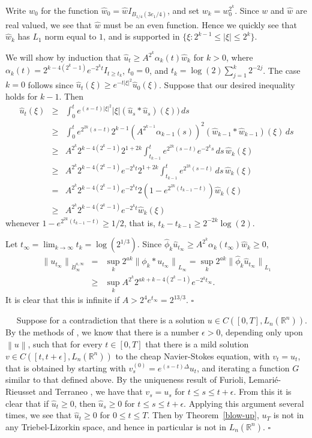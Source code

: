 \documentclass[12pt]{article}
\newcommand{\R}{{\mathbb R}}
\newcommand{\modo}[1]{{\left|#1\right|}}
\newcommand{\normo}[1]{{\left\|#1\right\|}}
\newcommand{\snormo}[1]{{\mathopen\|#1\mathclose\|}}
\newcommand{\Proofof}[1]{\medskip\noindent{\bf Proof of #1:}\ \ }
\newcommand{\qed}{\leavevmode\unskip\penalty9999
                  \hbox{}\nobreak\hfill$\square$\goodbreak\medskip}
\begin{document}
Write $w_0$ for the function
$
\hat w_0 = \hat w I_{B_{1/4}(3e_1/4)} 
$,
and set $w_k = w_0^{2^k}$.  Since $w$ and $\hat w$ are real valued,
we see that $\hat w$ must be an even function.
Hence we quickly see that
$\hat w_k$ has $L_1$ norm equal to $1$, and is supported in 
$\{\xi:2^{k-1} \le \modo\xi \le 2^k\}$.

We will show by induction
that
$
\hat u_t \ge A^{2^k} \alpha_k(t) \hat w_k 
$
for $k>0$,
where $\alpha_k(t) = 2^{k-4(2^k-1)} e^{-2^k t} I_{t \ge t_k}$,
$t_0=0$, and $t_k = \log(2) \sum_{j=1}^k 2^{-2j}$.
The case $k=0$ follows since
$\hat u_t(\xi) \ge e^{-t \modo{\xi}^2} \hat u_0(\xi)$.
Suppose that our desired inequality holds for $k-1$.  Then
\begin{eqnarray*}
\hat u_t(\xi)
&\ge&
\int_0^t e^{(s-t)\modo{\xi}^2} \modo{\xi} (\hat u_s*\hat u_s)(\xi)) \, ds\\
&\ge&
\int_0^t e^{2^{2k}(s-t)} 2^{k-1} (A^{2^{k-1}} \alpha_{k-1}(s))^2
(\hat w_{k-1}*\hat w_{k-1})(\xi) \, ds\\
&\ge&
A^{2^k} 2^{k-4(2^k-1)} 2^{1+2k}
\int_{t_{k-1}}^t e^{2^{2k}(s-t)} e^{-2^k s} \, ds \, 
\hat w_k(\xi) \\
&\ge&
A^{2^k} 2^{k-4(2^k-1)} e^{-2^k t} 2^{1+2k} 
\int_{t_{k-1}}^t e^{2^{2k}(s-t)} \, ds \, \hat w_k(\xi)\\
&=&
A^{2^k} 2^{k-4(2^k-1)} e^{-2^k t}
2(1-e^{2^{2k}(t_{k-1}-t)}) \hat w_k(\xi)\\
&\ge&
A^{2^k} 2^{k-4(2^k-1)} e^{-2^k t} \hat w_k(\xi)
\end{eqnarray*}
whenever $1-e^{2^{2k}(t_{k-1}-t)} \ge 1/2$, that is, $t_k-t_{k-1} \ge 
2^{-2k} \log(2)$.

Let $t_\infty = \lim_{k\to\infty} t_k
= \log(2^{1/3})$.
Since 
$\hat \phi_k \hat u_{t_\infty} \ge A^{2^k} \alpha_k(t_\infty) \hat w_k \ge 0$,
\begin{eqnarray*}
\snormo{u_{t_\infty}}_{\dot B_{\infty}^{a,\infty}} 
&=& 
\sup_k 2^{ak} \snormo{\phi_k*u_{t_\infty}}_{L_\infty}
=
\sup_k 2^{ak} \snormo{\hat \phi_k \hat u_{t_\infty}}_{L_1} 
\\
&\ge&
\sup_k 
A^{2^k} 2^{ak+k-4(2^k-1)} e^{-2^k t_\infty} .
\end{eqnarray*}
It is clear that this is infinite if $A>2^4 e^{t_\infty} = 2^{13/3}$.
\qed

\Proofof{Corollary~\ref{no-Ln}}
Suppose for a contradiction that there is a solution 
$u \in C([0,T],L_n(\R^n))$.  By the methods of \cite{K}, 
we know that there is a 
number $\epsilon>0$, depending only upon $\normo u$, such that
for every $t \in [0,T]$ that there is a mild solution 
$v \in C([t,t+\epsilon],L_n(\R^n))$ to the cheap Navier-Stokes equation, 
with $v_t = u_t$, that is obtained by starting with 
$v^{(0)}_s = e^{(s-t)\Delta} u_t$,
and iterating a function $G$ similar to that defined above.  
By the uniqueness result of Furioli, Lemari\'e-Rieusset 
and Terraneo \cite{FLT},
we have that $v_s = u_s$ for $t\le s \le t+\epsilon$.
From this it is clear that if $\hat u_t \ge 0$, then
$\hat u_s \ge 0$ for $t\le s \le t+\epsilon$.  Applying this argument
several times, we see that $\hat u_t \ge 0$
for $0 \le t \le T$.
Then by Theorem~\ref{blow-up}, $u_T$ is not in any
Triebel-Lizorkin space, and hence in particular is not in
$L_n(\R^n)$.
\qed
\end{document}

